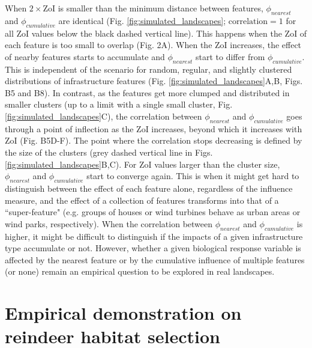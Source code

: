 \documentclass[titlepage]{article}
\begin{document}
{When $2 \times \text{ZoI}$ is smaller than the minimum distance between features, $\phi_{nearest}$ and $\phi_{cumulative}$ are identical (Fig. \ref{fig:simulated_landscapes}; $\text{correlation} = 1$ for all ZoI values below the black dashed vertical line). This happens when the ZoI of each feature is too small to overlap (Fig. 2A). When the ZoI increases, the effect of nearby features starts to accumulate and $\phi_{nearest}$ start to differ from $\phi_{cumulative}$. This is independent of the scenario for random, regular, and slightly clustered distributions of infrastructure features (Fig. \ref{fig:simulated_landscapes}A,B, Figs. B5 and B8). In contrast, as the features get more clumped and distributed in smaller clusters (up to a limit with a single small cluster, Fig. \ref{fig:simulated_landscapes}C), the correlation between $\phi_{nearest}$ and $\phi_{cumulative}$ goes through a point of inflection as the ZoI increases, beyond which it increases with ZoI (Fig. B5D-F). The point where the correlation stops decreasing is defined by the size of the clusters (grey dashed vertical line in Figs. \ref{fig:simulated_landscapes}B,C). For ZoI values larger than the cluster size, $\phi_{nearest}$ and $\phi_{cumulative}$ start to converge again. %
This is when it might get hard to distinguish between the effect of each feature alone, regardless of the influence measure, and the effect of a collection of features transforms into that of a ``super-feature" (e.g. groups of houses or wind turbines behave as urban areas or wind parks, respectively). 
When the correlation between $\phi_{nearest}$ and $\phi_{cumulative}$ is higher, it might be difficult to distinguish if the impacts of a given infrastructure type accumulate or not. 
However, whether a given biological response variable is affected by the nearest feature or by the cumulative influence of multiple features (or none) remain an empirical question to be explored in real landscapes. 

\section{Empirical demonstration on reindeer habitat selection}

}
\end{document}
